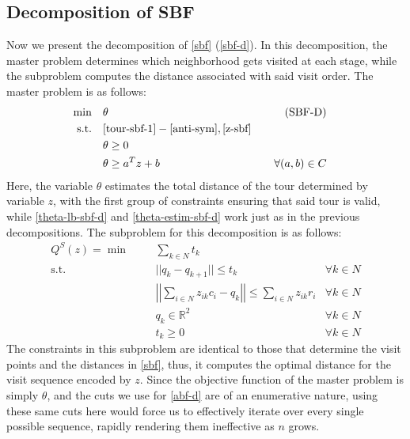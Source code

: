 \documentclass[pdflatex,sn-mathphys-num]{sn-jnl}%
\begin{document}
\subsection{Decomposition of SBF}

Now we present the decomposition of \ref{sbf} (\ref{sbf-d}). In this decomposition, the master problem determines which neighborhood gets visited at each stage, while the subproblem computes the distance associated with said visit order. The master problem is as follows:
\begin{subequations} 
\begin{align}
\min &&& \theta & \tag{SBF-D} \label{sbf-d}\\
\text{s.t.} &&& \eqref{tour-sbf-1}-\eqref{anti-sym}, \eqref{z-sbf}& \nonumber \\
&&& \theta \geq 0 & \label{theta-lb-sbf-d}\\
&&& \theta \geq a^Tz + b & \forall (a,b) \in C & \label{theta-estim-sbf-d}
\end{align}
\end{subequations}
Here, the variable $\theta$ estimates the total distance of the tour determined by variable $z$, with the first group of constraints ensuring that said tour is valid, while \eqref{theta-lb-sbf-d} and \eqref{theta-estim-sbf-d} work just as in the previous decompositions. 
The subproblem for this decomposition is as follows:
\begin{subequations}
\begin{align}
Q^S(z) = \min &&& \sum_{k \in N} t_k  & \label{obj-subpr-sbf}\\
\text{s.t.} &&& ||q_k - q_{k+1}|| \leq t_k &\forall k \in N \label{dist-sbf-d}\\
&&& \left|\left|\sum_{i \in N} {z}_{ik}  c_i - q_k\right|\right| \leq \sum_{i\in N} {z}_{ik}  r_i &\forall k \in N \label{neigh-sbf-d}\\
&&& q_{k} \in \mathbb{R}^2 &\forall k \in N \label{q-sbf-d}\\
&&& t_{k} \geq 0 & \forall k \in N \label{t-sbf-d}
\end{align}
\end{subequations}
The constraints in this subproblem are identical to those that determine the visit points and the distances in \ref{sbf}, thus, it computes the optimal distance for the visit sequence encoded by $z$. Since the objective function of the master problem is simply $\theta$, and the cuts we use for \ref{abf-d} are of an enumerative nature, using these same cuts here would force us to effectively iterate over every single possible sequence, rapidly rendering them ineffective as $n$ grows. 
\end{document}
